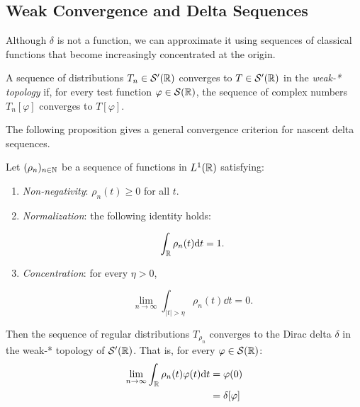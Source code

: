 

\subsection{Weak Convergence and Delta Sequences}

Although $\delta$ is not a function, we can approximate it using sequences of classical functions that become increasingly concentrated at the origin.

\begin{definition}
A sequence of distributions $T_n \in \mathcal{S}'(\mathbb{R})$ converges to $T \in \mathcal{S}'(\mathbb{R})$ in the \textit{weak-* topology} if, for every test function $\varphi \in \mathcal{S}(\mathbb{R})$, the sequence of complex numbers $T_n[\varphi]$ converges to $T[\varphi]$.
\end{definition}

The following proposition gives a general convergence criterion for nascent delta sequences.

\begin{proposition}
Let $(\rho_n)_{n \in \mathbb{N}}$ be a sequence of functions in $L^1(\mathbb{R})$ satisfying:
\begin{enumerate}
\item \textit{Non-negativity}: $\rho_n(t) \geq 0$ for all $t$.
\item \textit{Normalization}: the following identity holds:

\[
\int_{\mathbb{R}} \rho_n(t) \mathrm{d} t = 1.
\]

\item \textit{Concentration}: for every $\eta > 0$,

\[
\lim_{n \to \infty} \int_{|t| > \eta} \rho_n(t) \dd t = 0.
\]

\end{enumerate}
Then the sequence of regular distributions $T_{\rho_n}$ converges to the Dirac delta $\delta$ in the weak-* topology of $\mathcal{S}'(\mathbb{R})$. That is, for every $\varphi \in \mathcal{S}(\mathbb{R})$:
\begin{equation}
\begin{aligned}
\lim_{n \to \infty} \int_{\mathbb{R}} \rho_n(t) \varphi(t) \mathrm{d} t &= \varphi(0) \\
&= \delta[\varphi]
\end{aligned}
\end{equation}

\end{proposition}

